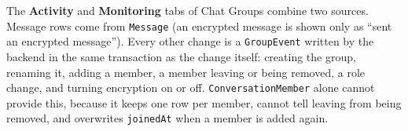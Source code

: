 The \textbf{Activity} and \textbf{Monitoring} tabs of Chat Groups combine two
sources. Message rows come from \texttt{Message} (an encrypted message is shown
only as ``sent an encrypted message''). Every other change is a
\texttt{GroupEvent} written by the backend in the same transaction as the change
itself: creating the group, renaming it, adding a member, a member leaving or
being removed, a role change, and turning encryption on or off.
\texttt{ConversationMember} alone cannot provide this, because it keeps one row per
member, cannot tell leaving from being removed, and overwrites \texttt{joinedAt}
when a member is added again.
